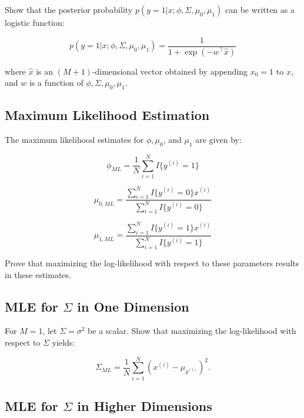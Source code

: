 \documentclass[lang=cn,11pt]{elegantbook}
\begin{document}
Show that the posterior probability $p(y=1|x;\phi,\Sigma,\mu_0,\mu_1)$ can be written as a logistic function:

\begin{equation}
    p(y=1|x;\phi,\Sigma,\mu_0,\mu_1) = \frac{1}{1 + \exp(-w^\top \hat{x})}
\end{equation}

where $\hat{x}$ is an $(M+1)$-dimensional vector obtained by appending $x_0=1$ to $x$, and $w$ is a function of $\phi,\Sigma,\mu_0,\mu_1$.

\subsection{Maximum Likelihood Estimation}

The maximum likelihood estimates for $\phi, \mu_0$, and $\mu_1$ are given by:

\begin{equation}
    \phi_{ML} = \frac{1}{N} \sum_{i=1}^{N} I\{y^{(i)} = 1\}
\end{equation}

\begin{equation}
    \mu_{0,ML} = \frac{\sum_{i=1}^{N} I\{y^{(i)} = 0\} x^{(i)}}{\sum_{i=1}^{N} I\{y^{(i)} = 0\}}
\end{equation}

\begin{equation}
    \mu_{1,ML} = \frac{\sum_{i=1}^{N} I\{y^{(i)} = 1\} x^{(i)}}{\sum_{i=1}^{N} I\{y^{(i)} = 1\}}
\end{equation}

Prove that maximizing the log-likelihood with respect to these parameters results in these estimates.

\subsection{MLE for $\Sigma$ in One Dimension}

For $M=1$, let $\Sigma = \sigma^2$ be a scalar. Show that maximizing the log-likelihood with respect to $\Sigma$ yields:

\begin{equation}
    \Sigma_{ML} = \frac{1}{N} \sum_{i=1}^{N} (x^{(i)} - \mu_{y^{(i)}})^2.
\end{equation}

\subsection{MLE for $\Sigma$ in Higher Dimensions}
\end{document}
